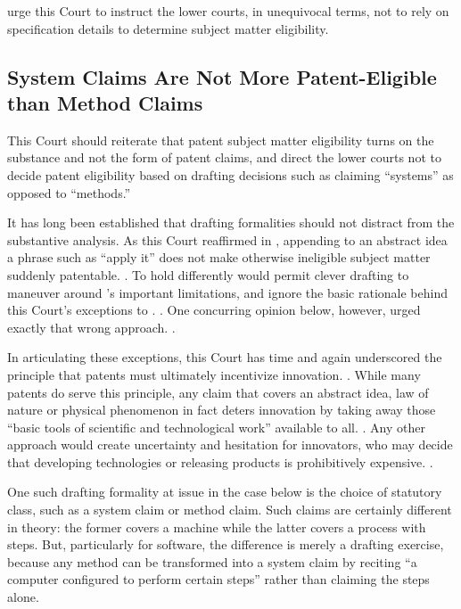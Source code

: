 \documentclass{scotus}
\begin{document}
\Amici urge this Court to instruct the lower courts, in unequivocal
terms, not to rely on specification details to determine subject matter
eligibility.



%
%
\subsection{System Claims Are Not More Patent-Eligible than Method Claims}

This Court should reiterate that patent subject matter eligibility turns on the
substance and not the form of patent claims, and direct
the lower courts not to decide patent eligibility based on drafting
decisions such as claiming “systems” as opposed to “methods.” 

It has long been established that drafting formalities should not
distract from
the substantive  analysis.  As this Court reaffirmed in
, appending to an abstract idea
a phrase such as “apply it” does
not make otherwise ineligible subject matter suddenly patentable. .  To hold differently would permit clever drafting to maneuver around
's important limitations, and ignore the basic rationale behind this
Court's exceptions to . . One concurring
opinion below, however, urged exactly that wrong approach. .

In articulating these
exceptions, this Court has time and again underscored the principle that patents
must ultimately incentivize innovation. . While many patents do serve this principle, any claim that
covers an abstract idea, law of nature or physical phenomenon in fact deters
innovation by taking away those “basic tools of scientific and technological
work”  available to all. . Any other approach
would create uncertainty and hesitation for innovators, who may decide
that developing technologies or releasing products is prohibitively
expensive. .

One such drafting formality at issue in the case below is the choice of
statutory class, such as a system
claim or method claim.
Such claims are certainly different in theory: the former covers a
machine while the latter covers a process with steps. But, particularly for
software, the difference is merely a drafting exercise, because any method can
be transformed into a system claim by reciting “a computer configured to perform
certain steps” rather than claiming the steps alone. 
\end{document}
